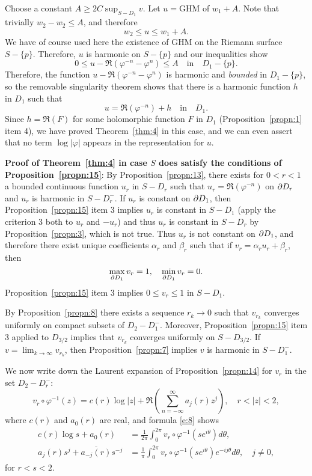 \documentclass[a4paper,11pt]{article}
\begin{document}
Choose a constant $A \ge 2C \sup_{S-D_1} v$.  Let $u = $GHM of $w_1 +
A$.  Note that trivially $w_2 - w_2 \le A$, and therefore
$$
w_2 \le u \le w_1 + A.
$$
We have of course used here the existence of GHM on the Riemann
surface $S - \{p\}$.  Therefore, $u$ is harmonic on $S - \{p\}$ and
our inequalities show
$$
0 \le u - \Re(\varphi^{-n} - \varphi^n) \le A \quad\text{in}\quad
D_1 - \{p\}.
$$
Therefore, the function $u - \Re(\varphi^{-n} - \varphi^n)$ is
harmonic and \emph{bounded} in $D_1 - \{p\}$, so the removable
singularity theorem shows that there is a harmonic function $h$ in
$D_1$ such that
$$
u = \Re(\varphi^{-n}) + h\quad\text{in}\quad D_1.
$$
Since $h = \Re(F)$ for some holomorphic function $F$ in $D_1$
(Proposition~\ref{propn:1} item 4), we have proved Theorem~\ref{thm:4}
in this case, and we can even assert that no term $\log|\varphi|$
appears in the representation for $u$.

\textbf{Proof of Theorem~\ref{thm:4} in case $S$ does satisfy the
  conditions of Proposition~\ref{propn:15}}:  By
Proposition~\ref{propn:13}, there exists for $0 < r < 1$ a bounded
continuous function $u_r$ in $S-D_r$ such that $u_r =
\Re(\varphi^{-n})$ on $\partial D_r$ and $u_r$ is harmonic in $S - D_r^-$.
If $u_r$ is constant on $\partial D_1$, then Proposition~\ref{propn:15} item
3 implies $u_r$ is constant in $S-D_1$ (apply the criterion 3 both to
$u_r$ and $-u_r$) and thus $u_r$ is constant in $S-D_r$ by
Proposition~\ref{propn:3}, which is not true.  Thus $u_r$ is not
constant on $\partial D_1$, and therefore there exist unique coefficients
$\alpha_r$ and $\beta_r$ such that if $v_r = \alpha_r u_r + \beta_r$,
then 
$$
\max_{\partial D_1} v_r = 1,\quad \min_{\partial D_1} v_r = 0.
$$
Proposition~\ref{propn:15} item 3 implies $0 \le v_r \le 1$ in $S -
D_1$.

By Proposition~\ref{propn:8} there exists a sequence $r_k \to 0$ such
that $v_{r_k}$ converges uniformly on compact subsets of $D_2 -
D_1^-$.  Moreover, Proposition~\ref{propn:15} item 3 applied to
$D_{3/2}$ implies that $v_{r_k}$ converges uniformly on $S -
D_{3/2}$.  If $v = \lim_{k\to\infty} v_{r_k}$, then
Proposition~\ref{propn:7} implies $v$ is harmonic in $S-D_1^-$.

We now write down the Laurent expansion of Proposition~\ref{propn:14}
for $v_r$ in the set $D_2 - D_r^-$:
$$
v_r \circ \varphi^{-1}(z) = c(r) \log|z| +
\Re(\sum_{n=-\infty}^{\infty} a_j(r) z^j),\quad
r < |z| < 2,
$$
where $c(r)$ and $a_0(r)$ are real, and formula \eqref{e:8} shows
\begin{equation}
  \label{e:10}
  \begin{aligned}
    c(r)\log s  + a_0(r) &= \frac{1}{2\pi} \int_0^{2\pi} v_r \circ
    \varphi^{-1}(s e^{i\theta}) d\theta,\\
    a_j(r) s^j + \overline{a_{-j}(r)} s^{-j}
    &= \frac{1}{\pi} \int_0^{2\pi} v_r \circ \varphi^{-1}(s
    e^{i\theta}) e^{-ij\theta} d \theta,\quad j\ne 0,
  \end{aligned}
\end{equation}
for $r < s < 2$.
\end{document}
